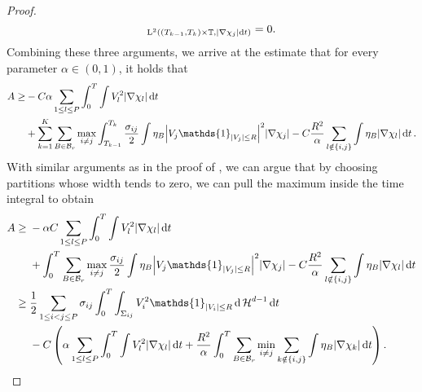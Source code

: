 \begin{proof}
\begin{equation*}
{		}_{ \operatorname{L}^{ 2 } \left(
			( T_{ k - 1 }, T_{ k } ) \times \operatorname{\mathbb{T}} ,
			\abs{ \nabla \chi_{ j } } \dd{ t }
			\right)
		}
		=
		0.
	\end{equation*}
	Combining these three arguments, we arrive at the estimate that for every 
	parameter $ \alpha \in ( 0 , 1 ) $, it holds that
	\begin{align*}
		A \geq &
		- C \alpha 
		\sum_{ 1 \leq l \leq P }
			\int_{ 0 }^{ T }
				\int
					V_{ l }^{ 2 }
				\abs{ \nabla \chi_{ l } }
			\dd{ t }
		\\
		& +
		\sum_{ k = 1 }^{ K }
			\sum_{ B \in \mathcal{ B }_{ r } }
				\max_{ i \neq j }
					\int_{ T_{ k - 1 } }^{ T_{ k } } 
						\frac{ \sigma_{ i j } }{ 2 }
						\int
							\eta_{ B }
							\abs{ V_{ j } \mathds{ 1 }_{ \abs{ V_{ j } } \leq R 
							} }^{ 2 }
						\abs{ \nabla \chi_{ j } }
					- 
					C \frac{ R^{ 2 } }{ \alpha }
					\sum_{ l \notin \{ i , j \} }
							\int
								\eta_{ B }
							\abs{ \nabla \chi_{ l } }
						\dd{ t }.
	\end{align*}
	With similar arguments as in the proof of 
	, we can argue that by choosing 
	partitions whose width tends to zero, we can pull the maximum inside the 
	time integral to obtain 
	\begin{align*}
		A\geq{}  & 
		- \alpha C
		\sum_{ 1 \leq l \leq P }
		\int_{ 0 }^{ T }
		\int
		V_{ l }^{ 2 }
		\abs{ \nabla \chi_{ l } }
		\dd{ t }
		\\
		& +
		\int_{ 0 }^{ T }
		\sum_{ B \in \mathcal{ B }_{ r } }
		\max_{ i \neq j }
		\frac{ \sigma_{ i j } }{ 2 }
		\int
		\eta_{ B }
		\abs{ V_{ j } \mathds{ 1 }_{ \abs{ V_{ j } } \leq R 
		} }^{ 2 }
		\abs{ \nabla \chi_{ j } }
		- 
		C \frac{ R^{ 2 } }{ \alpha }
		\sum_{ l \notin \{ i , j \} }
		\int
		\eta_{ B }
		\abs{ \nabla \chi_{ l } }
		\dd{ t }
		\\
		\geq{} &
		\frac{ 1 }{ 2 }
		\sum_{ 1 \leq i < j \leq P }
			\sigma_{ i j }
			\int_{ 0 }^{ T }
				\int_{ \Sigma_{ i j } }
					V_{ i }^{ 2 } \mathds{ 1 }_{ \abs{ V_{ i } } \leq R }
				\dd{ \hm^{ d - 1 } }
			\dd{ t }
		\\
		& -
		C \left(
			\alpha \sum_{ 1 \leq l \leq P }
				\int_{ 0 }^{ T }
					\int
						V_{ l }^{ 2 }
					\abs{ \nabla \chi_{ l } }
				\dd{ t }
			+
			\frac{ R^{ 2 } }{ \alpha }
			\int_{ 0 }^{ T }
				\sum_{ B \in \mathcal{ B }_{ r } }
					\min_{ i \neq j }
						\sum_{ k \notin \{ i , j \} }
							\int
								\eta_{ B }
							\abs{ \nabla \chi_{ k } }
			\dd{ t }
		\right).
	\end{align*}

\end{proof}

